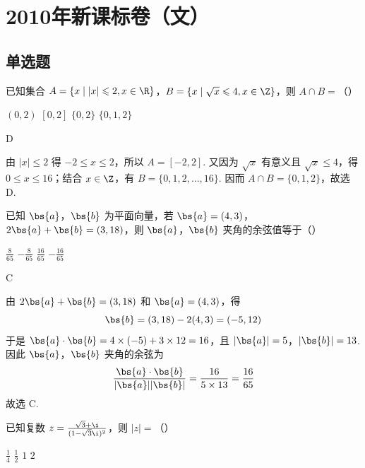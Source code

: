 \chapter{2010年新课标卷（文）}

\section{单选题}

\begin{problem}
已知集合 \(A = \{x \mid |x| \leqslant 2, x \in \R\}\)，\(B = \{x \mid \sqrt{x} \leqslant 4, x \in \Z\}\)，则 \(A \cap B =\)（\quad）

\choices
    {\((0,2)\)}
    {\([0,2]\)}
    {\(\{0,2\}\)}
    {\(\{0,1,2\}\)}
\end{problem}

\begin{answer}
D
\end{answer}

\begin{solution}
由 \(|x|\leqslant 2\) 得 \(-2\leqslant x\leqslant 2\)，所以 \(A=[-2,2]\). 又因为 \(\sqrt{x}\) 有意义且 \(\sqrt{x}\leqslant4\)，得 \(0\leqslant x\leqslant16\)；结合 \(x\in\Z\)，有 \(B=\{0,1,2,\ldots,16\}\). 因而 \(A\cap B=\{0,1,2\}\)，故选 D.
\end{solution}

\begin{problem}
已知 \(\bs{a}\)，\(\bs{b}\) 为平面向量，若 \( \bs{a} = (4, 3) \)，\( 2\bs{a} + \bs{b} = (3, 18) \)，则 \(\bs{a}\)，\(\bs{b}\) 夹角的余弦值等于（\quad）

\choices
    {\(\frac{8}{65}\)}
    {\(-\frac{8}{65}\)}
    {\(\frac{16}{65}\)}
    {\(-\frac{16}{65}\)}
\end{problem}

\begin{answer}
C
\end{answer}

\begin{solution}
由 \(2\bs{a}+\bs{b}=(3,18)\) 和 \(\bs{a}=(4,3)\)，得
\[
\bs{b}=(3,18)-2(4,3)=(-5,12)
\]
于是 \(\bs{a}\cdot\bs{b}=4\times(-5)+3\times12=16\)，且 \(|\bs{a}|=5\)，\(|\bs{b}|=13\). 因此 \(\bs{a}\)，\(\bs{b}\) 夹角的余弦为
\[
\frac{\bs{a}\cdot\bs{b}}{|\bs{a}||\bs{b}|}=\frac{16}{5\times13}=\frac{16}{65}
\]
故选 C.
\end{solution}

\begin{problem}
已知复数 \(z = \frac{\sqrt{3} + \i}{(1 - \sqrt{3}\i)^2}\)，则 \(|z| =\)（\quad）

\choices
    {\(\frac{1}{4}\)}
    {\(\frac{1}{2}\)}
    {\(1\)}
    {\(2\)}
\end{problem}

